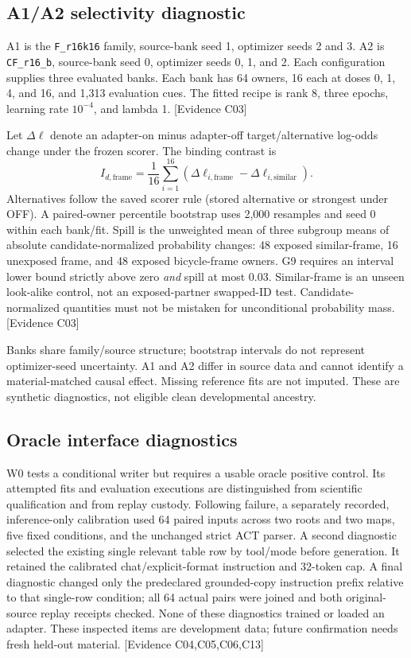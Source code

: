 \documentclass[11pt]{article}
\newcommand{\ev}[1]{\textsf{[Evidence #1]}}
\begin{document}
\subsection{A1/A2 selectivity diagnostic}
A1 is the \texttt{F\_r16k16} family, source-bank seed 1, optimizer seeds 2 and 3.
A2 is \texttt{CF\_r16\_b}, source-bank seed 0, optimizer seeds 0, 1, and 2.
Each configuration supplies three evaluated banks. Each bank has 64 owners,
16 each at doses 0, 1, 4, and 16, and 1,313 evaluation cues. The fitted recipe
is rank 8, three epochs, learning rate $10^{-4}$, and lambda 1. \ev{C03}

Let $\Delta\ell$ denote an adapter-on minus adapter-off target/alternative
log-odds change under the frozen scorer. The binding contrast is
\[
 I_{d,\mathrm{frame}}=\frac{1}{16}\sum_{i=1}^{16}
 (\Delta\ell_{i,\mathrm{frame}}-\Delta\ell_{i,\mathrm{similar}}).
\]
Alternatives follow the saved scorer rule (stored alternative or strongest under
OFF). A paired-owner percentile bootstrap uses 2,000 resamples and seed 0 within
each bank/fit. Spill is the unweighted mean of three subgroup means of absolute
candidate-normalized probability changes: 48 exposed similar-frame, 16 unexposed
frame, and 48 exposed bicycle-frame owners. G9 requires an interval lower bound
strictly above zero \emph{and} spill at most 0.03. Similar-frame is an unseen
look-alike control, not an exposed-partner swapped-ID test. Candidate-normalized
quantities must not be mistaken for unconditional probability mass. \ev{C03}

Banks share family/source structure; bootstrap intervals do not represent
optimizer-seed uncertainty. A1 and A2 differ in source data and cannot identify
a material-matched causal effect. Missing reference fits are not imputed. These
are synthetic diagnostics, not eligible clean developmental ancestry.

\subsection{Oracle interface diagnostics}
W0 tests a conditional writer but requires a usable oracle positive control.
Its attempted fits and evaluation executions are distinguished from scientific
qualification and from replay custody. Following failure, a separately recorded,
inference-only calibration used 64 paired inputs across two roots and two maps,
five fixed conditions, and the unchanged strict ACT parser. A second diagnostic
selected the existing single relevant table row by tool/mode before generation.
It retained the calibrated chat/explicit-format instruction and 32-token cap.
A final diagnostic changed only the predeclared grounded-copy instruction prefix
relative to that single-row condition; all 64 actual pairs were joined and both
original-source replay receipts checked. None of these diagnostics trained or
loaded an adapter. These inspected items are development data; future
confirmation needs fresh held-out material. \ev{C04,C05,C06,C13}
\end{document}
